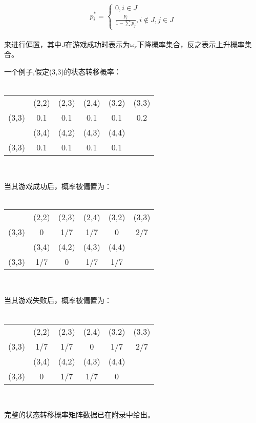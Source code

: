 \documentclass[hyperref]{ctexart}
\begin{document}
\begin{multicols}{2}
    \noindent
    \begin{equation}
        p_i^* = \begin{cases} 0, i \in J \\ \frac{p_i}{1 - \sum p_j}, i \notin J ,j \in J\end{cases}
    \end{equation}\\
    来进行偏置，其中$J$在游戏成功时表示为$\omega_r$下降概率集合，反之表示上升概率集合。
    \par\indent\par
    一个例子,假定(3,3)的状态转移概率：\\
    \\
    \begin{tabular}{c|ccccc}
      & (2,2) & (2,3)  & (2,4) & (3,2) & (3,3)\\
	(3,3) & 0.1 & 0.1& 0.1& 0.1& 0.2\\
	\hline & (3,4) & (4,2) & (4,3) & (4,4) \\
	(3,3) & 0.1& 0.1& 0.1& 0.1
    \end{tabular}\\
    \par
    当其游戏成功后，概率被偏置为：\\ \\
    \begin{tabular}{c|ccccc}
      & (2,2) & (2,3)  & (2,4) & (3,2) & (3,3)\\
	(3,3) & 0 & 1/7 & 1/7 & 0& 2/7\\
	\hline & (3,4) & (4,2) & (4,3) & (4,4) \\
	(3,3) & 1/7& 0& 1/7& 1/7
    \end{tabular}\\
    \par
    当其游戏失败后，概率被偏置为：\\ \\
    \begin{tabular}{c|ccccc}
      & (2,2) & (2,3)  & (2,4) & (3,2) & (3,3)\\
	(3,3) & 1/7 & 1/7 & 0 & 1/7& 2/7\\
	\hline & (3,4) & (4,2) & (4,3) & (4,4) \\
	(3,3) & 0& 1/7 & 1/7& 0
    \end{tabular}\\
    \par
    完整的状态转移概率矩阵数据已在附录中给出。

\end{multicols}
\end{document}
